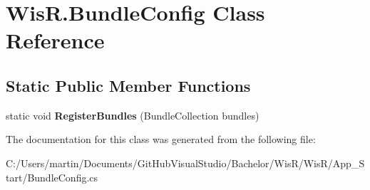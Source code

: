 \hypertarget{class_wis_r_1_1_bundle_config}{}\section{Wis\+R.\+Bundle\+Config Class Reference}
\label{class_wis_r_1_1_bundle_config}
\subsection*{Static Public Member Functions}
\begin{DoxyCompactItemize}
\item 
\hypertarget{class_wis_r_1_1_bundle_config_a06e43fa63642d9a8e46eba6e0a74a943}{}static void {\bfseries Register\+Bundles} (Bundle\+Collection bundles)\label{class_wis_r_1_1_bundle_config_a06e43fa63642d9a8e46eba6e0a74a943}

\end{DoxyCompactItemize}


The documentation for this class was generated from the following file\+:\begin{DoxyCompactItemize}
\item 
C\+:/\+Users/martin/\+Documents/\+Git\+Hub\+Visual\+Studio/\+Bachelor/\+Wis\+R/\+Wis\+R/\+App\+\_\+\+Start/Bundle\+Config.\+cs\end{DoxyCompactItemize}
